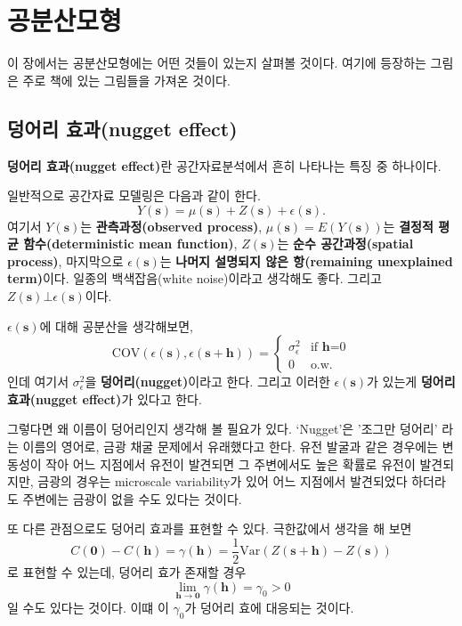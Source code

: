 \documentclass[b5paper,]{scrbook}
\theoremstyle{plain}
\theoremstyle{definition}
\numberwithin{equation}{section}
\begin{document}
\hypertarget{covmodel}{%
\chapter{공분산모형}\label{covmodel}}

이 장에서는 공분산모형에는 어떤 것들이 있는지 살펴볼 것이다. 여기에 등장하는 그림은 주로 \citep{Montero2015} 책에 있는 그림들을 가져온 것이다.

\hypertarget{-nugget-effect}{%
\section{덩어리 효과(nugget effect)}\label{-nugget-effect}}

\textbf{덩어리 효과(nugget effect)}란 공간자료분석에서 흔히 나타나는 특징 중 하나이다.

일반적으로 공간자료 모델링은 다음과 같이 한다.
\[Y(\mathbf{s})=\mu(\mathbf{s})+Z(\mathbf{s})+\epsilon(\mathbf{s}).\]
여기서 \(Y(\mathbf{s})\)는 \textbf{관측과정(observed process)}, \(\mu(\mathbf{s})=E(Y(\mathbf{s}))\)는 \textbf{결정적 평균 함수(deterministic mean function)}, \(Z(\mathbf{s})\)는 \textbf{순수 공간과정(spatial process)}, 마지막으로 \(\epsilon(\mathbf{s})\)는 \textbf{나머지 설명되지 않은 항(remaining unexplained term)}이다. 일종의 백색잡음(white noise)이라고 생각해도 좋다. 그리고 \(Z(\mathbf{s}) \bot \epsilon(\mathbf{s})\)이다.

\(\epsilon(\mathbf{s})\)에 대해 공분산을 생각해보면,
\[
\text{COV}(\epsilon(\mathbf{s}),\epsilon(\mathbf{s}+\mathbf{h}))= \left\{ \begin{array}{ll}
\sigma_{\epsilon}^{2} & \textrm{if $\mathbf{h}$=0}\\
0 & \textrm{o.w.}
\end{array} \right.
\]
인데 여기서 \(\sigma_{\epsilon}^{2}\)을 \textbf{덩어리(nugget)}이라고 한다. 그리고 이러한 \(\epsilon(\mathbf{s})\)가 있는게 \textbf{덩어리 효과(nugget effect)}가 있다고 한다.

그렇다면 왜 이름이 덩어리인지 생각해 볼 필요가 있다. `Nugget'은 '조그만 덩어리' 라는 이름의 영어로, 금광 채굴 문제에서 유래했다고 한다. 유전 발굴과 같은 경우에는 변동성이 작아 어느 지점에서 유전이 발견되면 그 주변에서도 높은 확률로 유전이 발견되지만, 금광의 경우는 microscale variability가 있어 어느 지점에서 발견되었다 하더라도 주변에는 금광이 없을 수도 있다는 것이다.

또 다른 관점으로도 덩어리 효과를 표현할 수 있다. 극한값에서 생각을 해 보면
\[C(\mathbf{0})-C(\mathbf{h})=\gamma(\mathbf{h})=\frac{1}{2}\text{Var}(Z(\mathbf{s}+\mathbf{h})-Z(\mathbf{s}))\]
로 표현할 수 있는데, 덩어리 효가 존재할 경우
\[\lim_{\mathbf{h}\rightarrow \mathbf{0}}\gamma(\mathbf{h})=\gamma_{0} >0\]
일 수도 있다는 것이다. 이떄 이 \(\gamma_{0}\)가 덩어리 효에 대응되는 것이다.
\end{document}
